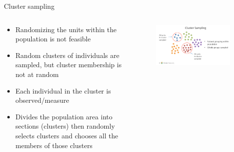 \documentclass[10pt, compress]{beamer}
\begin{document}
\begin{frame}[t]{Cluster sampling}
    \begin{columns}
        \begin{block}{}
            \begin{itemize}
                \item Randomizing the units within the population is not feasible
                \item Random clusters of individuals are sampled, but cluster membership is not at random
                \item Each individual in the cluster is observed/measure
                \item Divides the population area into sections (clusters) then randomly selects clusters and chooses all the members of those clusters
            \end{itemize}
        \end{block}
        \begin{block}{}
            \begin{figure}
                \begin{center}
                    \includegraphics[scale=0.25]{img/Slide5.png}
                \end{center}
            \end{figure}
        \end{block}
    \end{columns}

\end{frame}
\end{document}

